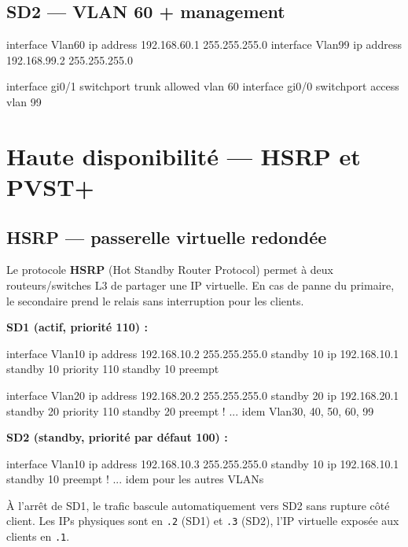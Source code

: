 \documentclass[11pt,a4paper]{article}
\begin{document}
\subsection{SD2 — VLAN 60 + management}

\begin{ciscobox}
interface Vlan60
 ip address 192.168.60.1 255.255.255.0
interface Vlan99
 ip address 192.168.99.2 255.255.255.0

interface gi0/1
 switchport trunk allowed vlan 60
interface gi0/0
 switchport access vlan 99
\end{ciscobox}

\section{Haute disponibilité — HSRP et PVST+}

\subsection{HSRP — passerelle virtuelle redondée}

Le protocole \textbf{HSRP} (Hot Standby Router Protocol) permet à deux routeurs/switches L3 de partager une IP virtuelle. En cas de panne du primaire, le secondaire prend le relais sans interruption pour les clients.

\textbf{SD1 (actif, priorité 110) :}
\begin{ciscobox}
interface Vlan10
 ip address 192.168.10.2 255.255.255.0
 standby 10 ip 192.168.10.1
 standby 10 priority 110
 standby 10 preempt

interface Vlan20
 ip address 192.168.20.2 255.255.255.0
 standby 20 ip 192.168.20.1
 standby 20 priority 110
 standby 20 preempt
! ... idem Vlan30, 40, 50, 60, 99
\end{ciscobox}

\textbf{SD2 (standby, priorité par défaut 100) :}
\begin{ciscobox}
interface Vlan10
 ip address 192.168.10.3 255.255.255.0
 standby 10 ip 192.168.10.1
 standby 10 preempt
! ... idem pour les autres VLANs
\end{ciscobox}

\begin{techbox}[title={\faSync~Comportement observé}]
À l'arrêt de SD1, le trafic bascule automatiquement vers SD2 sans rupture côté client. Les IPs physiques sont en \texttt{.2} (SD1) et \texttt{.3} (SD2), l'IP virtuelle exposée aux clients en \texttt{.1}.
\end{techbox}
\end{document}
